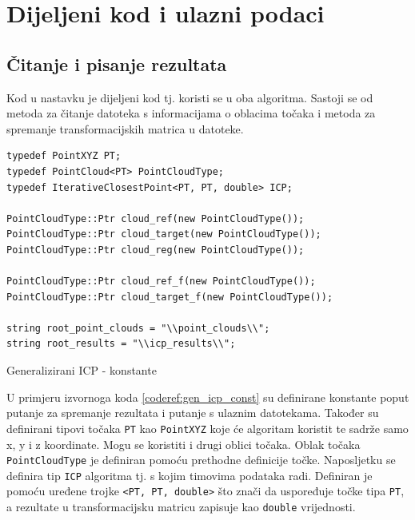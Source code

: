 \section{Dijeljeni kod i ulazni podaci}

\subsection{Čitanje i pisanje rezultata}

Kod u nastavku je dijeljeni kod tj. koristi se u oba algoritma. Sastoji se od metoda za čitanje datoteka s informacijama o oblacima točaka i metoda za spremanje transformacijskih matrica u datoteke. 

\begin{listing}[h!]
  \begin{verbatim}
typedef PointXYZ PT;
typedef PointCloud<PT> PointCloudType;
typedef IterativeClosestPoint<PT, PT, double> ICP;

PointCloudType::Ptr cloud_ref(new PointCloudType());
PointCloudType::Ptr cloud_target(new PointCloudType());
PointCloudType::Ptr cloud_reg(new PointCloudType());

PointCloudType::Ptr cloud_ref_f(new PointCloudType());
PointCloudType::Ptr cloud_target_f(new PointCloudType());

string root_point_clouds = "\\point_clouds\\";
string root_results = "\\icp_results\\";
  \end{verbatim}
  \caption{Generalizirani ICP - konstante}
  \label{coderef:gen_icp_const}
\end{listing}

U primjeru izvornoga koda \ref{coderef:gen_icp_const} su definirane konstante poput putanje za spremanje rezultata i putanje s ulaznim datotekama. Također su definirani tipovi točaka \texttt{PT} kao \texttt{PointXYZ} koje će algoritam koristit te sadrže samo x, y i z koordinate. Mogu se koristiti i drugi oblici točaka. Oblak točaka \texttt{PointCloudType} je definiran pomoću prethodne definicije točke. Naposljetku se definira tip \texttt{ICP} algoritma tj. s kojim timovima podataka radi. Definiran je pomoću uređene trojke \texttt{<PT, PT, double>} što znači da uspoređuje točke tipa \texttt{PT}, a rezultate u transformacijsku matricu zapisuje kao \texttt{double} vrijednosti.

